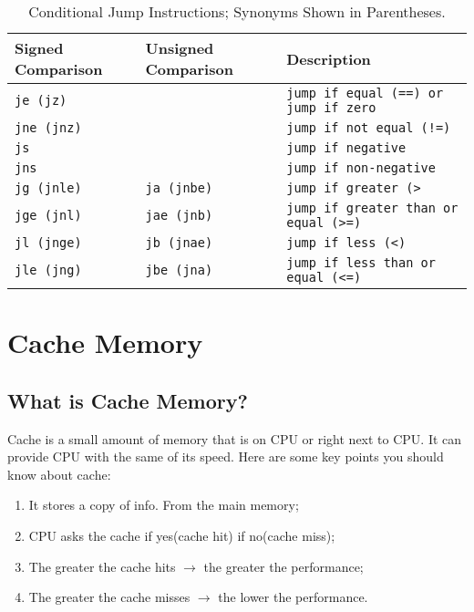 \documentclass{article}
\begin{document}
\begin{table}[p]
\centering
\begin{tabularx}{\textwidth}{lll}
\hline
\textbf{Signed Comparison} & \textbf{Unsigned Comparison} & \textbf{Description} \\
\hline
\texttt{je (jz)}  & & \texttt{jump if equal (==) or jump if zero} \\
\texttt{jne (jnz)} & & \texttt{jump if not equal (!=)} \\
\texttt{js}       & & \texttt{jump if negative} \\
\texttt{jns}      & & \texttt{jump if non-negative} \\
\texttt{jg (jnle)} & \texttt{ja (jnbe)} & \texttt{jump if greater (>} \\
\texttt{jge (jnl)} & \texttt{jae (jnb)} & \texttt{jump if greater than or equal (>=)} \\
\texttt{jl (jnge)} & \texttt{jb (jnae)} & \texttt{jump if less (<)} \\
\texttt{jle (jng)} & \texttt{jbe (jna)} & \texttt{jump if less than or equal (<=)} \\
\hline
\end{tabularx}
\caption{Conditional Jump Instructions; Synonyms Shown in Parentheses.}
\label{table:conditional-jump-instructions}
\end{table}




\newpage
\section{Cache Memory}
\subsection{What is Cache Memory?}
Cache is a small amount of memory that is on CPU or right next to CPU. It can provide CPU with the same of its speed. Here are some key points you should know about cache:
\begin{enumerate}
    \item It stores a copy of info. From the main memory;
    \item CPU asks the cache if yes(cache hit) if no(cache miss);
    \item The greater the cache hits $\rightarrow$ the greater the performance;
    \item The greater the cache misses $\rightarrow$ the lower the performance.
\end{enumerate}
\end{document}
